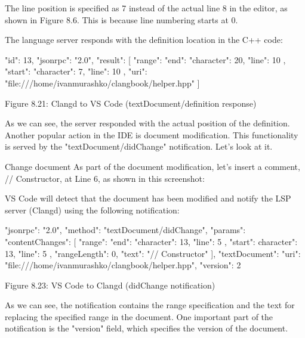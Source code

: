 The line position is specified as 7 instead of the actual line 8 in the editor, as shown in Figure 8.6. This is because line numbering starts at 0.

The language server responds with the definition location in the C++ code:

\begin{shell}
{
  "id": 13,
  "jsonrpc": "2.0",
  "result": [
  {
    "range": {
      "end": {
        "character": 20,
        "line": 10
      },
      "start": {
        "character": 7,
        "line": 10
      }
    },
    "uri": "file:///home/ivanmurashko/clangbook/helper.hpp"
  }
  ]
}
\end{shell}

\begin{center}
Figure 8.21: Clangd to VS Code (textDocument/definition response)
\end{center}

As we can see, the server responded with the actual position of the definition. Another popular action in the IDE is document modification. This functionality is served by the "textDocument/didChange" notification. Let’s look at it.

Change document
As part of the document modification, let’s insert a comment, // Constructor, at Line 6, as shown in this screenshot:


VS Code will detect that the document has been modified and notify the LSP server (Clangd) using the following notification:

\begin{shell}
{
  "jsonrpc": "2.0",
  "method": "textDocument/didChange",
  "params": {
    "contentChanges": [
      {
        "range": {
          "end": {
            "character": 13,
            "line": 5
          },
          "start": {
            character": 13,
            "line": 5
          }
        },
        "rangeLength": 0,
        "text": "// Constructor"
      }
    ],
    "textDocument": {
      "uri": "file:///home/ivanmurashko/clangbook/helper.hpp",
      "version": 2
    }
  }
}
\end{shell}

\begin{center}
Figure 8.23: VS Code to Clangd (didChange notification)
\end{center}

As we can see, the notification contains the range specification and the text for replacing the specified range in the document. One important part of the notification is the "version" field, which specifies the version of the document.

